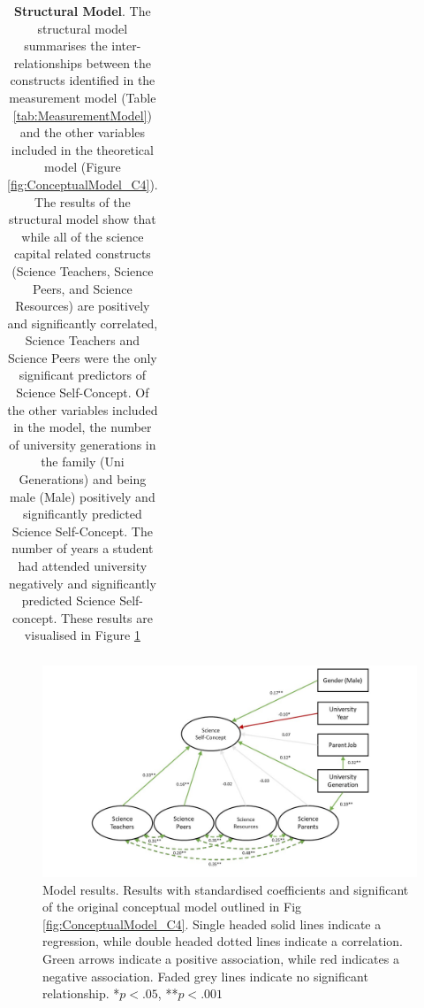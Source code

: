 \begin{landscape}
\begin{table}[ht]
\begin{tabular}{llrrrrr}
   \hline
\end{tabular}
\caption{\textbf{Structural Model}. The structural model summarises the inter-relationships between the constructs identified in the measurement model (Table \ref{tab:MeasurementModel}) and the other variables included in the theoretical model (Figure  \ref{fig:ConceptualModel_C4}). The results of the structural model show that while all of the science capital related constructs (Science Teachers, Science Peers, and Science Resources) are positively and significantly correlated, Science Teachers and Science Peers were the only significant predictors of Science Self-Concept. Of the other variables included in the model, the number of university generations in the family (Uni Generations) and being male (Male) positively and significantly predicted Science Self-Concept. The number of years a student had attended university negatively and significantly predicted Science Self-concept. These results are visualised in Figure \ref{fig:ConceptualModel_results_C4} }
\label{tab:StructuralModel}
\end{table}
\end{landscape}

\begin{figure}
 \includegraphics[width = \linewidth]{C4 - Science Capital Self-Concept/ConceptualModel_results.jpg}
\caption{Model results. Results with standardised coefficients and significant of the original conceptual model outlined in Fig \ref{fig:ConceptualModel_C4}. Single headed solid lines indicate a regression, while double headed dotted lines indicate a correlation. Green arrows indicate a positive association, while red indicates a negative association. Faded grey lines indicate no significant relationship. *$p <.05$, **$p <.001$}
\label{fig:ConceptualModel_results_C4}       
\end{figure}


